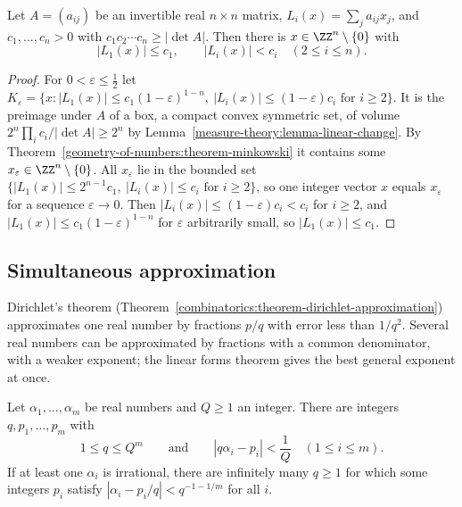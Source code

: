 \begin{corollary}\label{geometry-of-numbers:corollary-linear-forms}
Let $A = (a_{ij})$ be an invertible real $n \times n$ matrix, $L_i(x) = \sum_ja_{ij}x_j$, and $c_1, \ldots, c_n > 0$ with $c_1c_2\cdots c_n \geq |\det A|$. Then there is $x \in \ZZ^n \setminus \{0\}$ with
\[
|L_1(x)| \leq c_1, \qquad |L_i(x)| < c_i \quad (2 \leq i \leq n).
\]
\end{corollary}

\begin{proof}
For $0 < \varepsilon \leq \frac12$ let $K_\varepsilon = \{x : |L_1(x)| \leq c_1(1 - \varepsilon)^{1-n}, \ |L_i(x)| \leq (1 - \varepsilon)c_i \text{ for } i \geq 2\}$. It is the preimage under $A$ of a box, a
compact convex symmetric set, of volume $2^n\prod_ic_i/|\det A| \geq 2^n$ by Lemma~\ref{measure-theory:lemma-linear-change}. By Theorem~\ref{geometry-of-numbers:theorem-minkowski} it contains some
$x_\varepsilon \in \ZZ^n \setminus \{0\}$. All $x_\varepsilon$ lie in the bounded set $\{|L_1(x)| \leq 2^{n-1}c_1, \ |L_i(x)| \leq c_i \text{ for } i \geq 2\}$, so one integer vector $x$ equals $x_\varepsilon$ for a sequence $\varepsilon \to 0$. Then
$|L_i(x)| \leq (1 - \varepsilon)c_i < c_i$ for $i \geq 2$, and $|L_1(x)| \leq c_1(1 - \varepsilon)^{1-n}$ for $\varepsilon$ arbitrarily small, so $|L_1(x)| \leq c_1$.
\end{proof}

\subsection{Simultaneous approximation}\label{geometry-of-numbers:subsection-simultaneous}

Dirichlet's theorem (Theorem~\ref{combinatorics:theorem-dirichlet-approximation}) approximates one real number by fractions $p/q$ with error less than $1/q^2$. Several real numbers can be
approximated by fractions with a common denominator, with a weaker exponent; the linear forms theorem gives the best general exponent at once.

\begin{theorem}\label{geometry-of-numbers:theorem-simultaneous}
Let $\alpha_1, \ldots, \alpha_m$ be real numbers and $Q \geq 1$ an integer. There are integers $q, p_1, \ldots, p_m$ with
\[
1 \leq q \leq Q^m \qquad\text{and}\qquad |q\alpha_i - p_i| < \frac1Q \quad (1 \leq i \leq m).
\]
If at least one $\alpha_i$ is irrational, there are infinitely many $q \geq 1$ for which some integers $p_i$ satisfy $|\alpha_i - p_i/q| < q^{-1-1/m}$ for all $i$.
\end{theorem}

